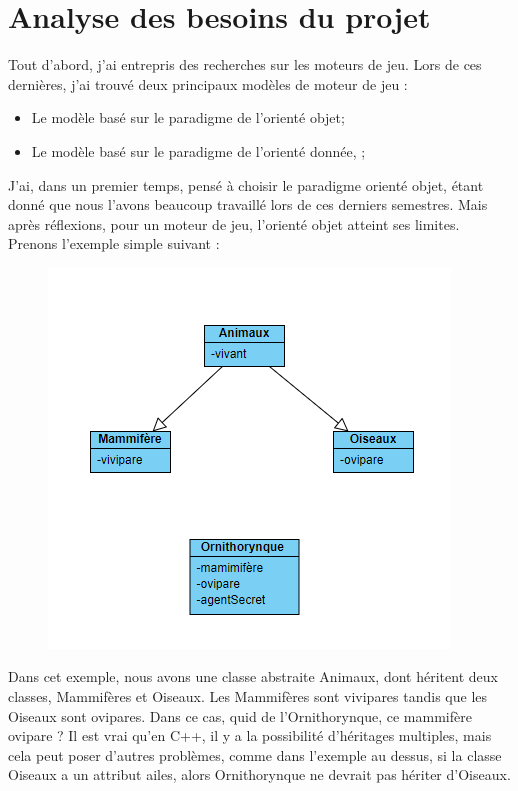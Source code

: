 \documentclass[12pt, openany]{report}
\begin{document}
\chapter{Analyse des besoins du projet}
Tout d'abord, j'ai entrepris des recherches sur les moteurs de jeu. Lors de ces derni\`eres, j'ai trouv\'e deux principaux mod\`eles de  moteur de jeu : \\
\begin{itemize}
\item Le mod\`ele bas\'e sur le paradigme de l'orient\'e objet;
\item Le mod\`ele bas\'e sur le paradigme de l'orient\'e donn\'ee, ;
\end{itemize}
\indent J'ai, dans un premier temps, pens\'e \`a choisir le paradigme orient\'e objet, \'etant donn\'e que nous l'avons beaucoup travaill\'e lors de ces derniers semestres. Mais apr\`es r\'eflexions, pour un moteur de jeu, l'orient\'e objet atteint ses limites. Prenons l'exemple simple suivant :
\\[0.2cm]
\begin{figure}[!h]
\centering
\includegraphics[scale=1]{illustrationOO.png}
\end{figure}
\newpage
\indent Dans cet exemple, nous avons une classe abstraite Animaux, dont h\'eritent deux classes, Mammif\`eres et Oiseaux. Les Mammif\`eres sont vivipares tandis que les Oiseaux sont ovipares. Dans ce cas, quid de l'Ornithorynque, ce mammif\`ere ovipare ? Il est vrai qu'en C++, il y a la possibilit\'e d'h\'eritages multiples, mais cela peut poser d'autres probl\`emes, comme dans l'exemple au dessus, si la classe Oiseaux a un attribut ailes, alors Ornithorynque ne devrait pas h\'eriter d'Oiseaux.
\end{document}

